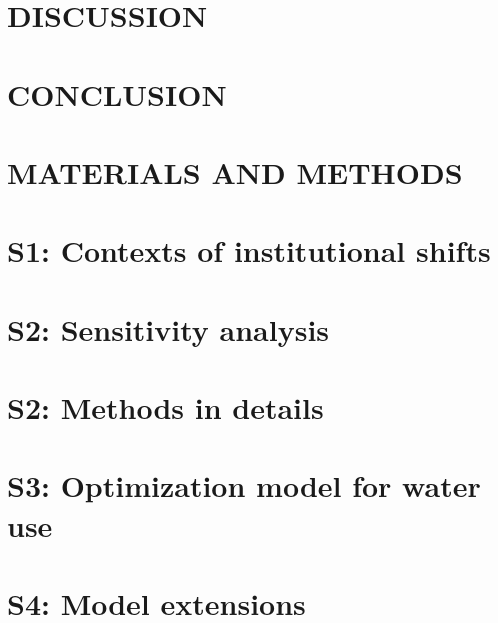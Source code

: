 \documentclass{../nsr}
\begin{document}
\section{DISCUSSION}\label{sec:discussion}


\section{CONCLUSION}\label{sec:conclusion}


\section{MATERIALS AND METHODS}\label{sec:methods}



\appendix
\label{appendix}

\section{S1: Contexts of institutional shifts}\label{secS1}


\section{S2: Sensitivity analysis}\label{secS2}


\section{S2: Methods in details}\label{secS3}


\section{S3: Optimization model for water use}\label{secS4}


\section{S4: Model extensions}\label{secS5}



\label{bib}
\end{document}
